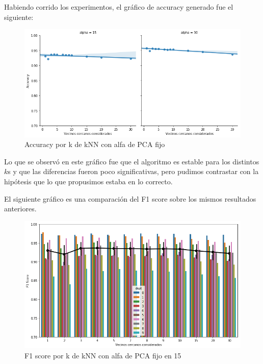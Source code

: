 Habiendo corrido los experimentos, el gráfico de accuracy generado fue el siguiente:

\begin{figure}[H]
    \begin{center}
      \includegraphics[width=0.8\columnwidth]{imagenes/Accuracy_15_30.png}
      \caption{Accuracy por k de kNN con alfa de PCA fijo}
    \end{center}
\end{figure}

Lo que se observó en este gráfico fue que el algoritmo es estable para los distintos $k$s y que las diferencias fueron poco significativas, pero pudimos contrastar con la hipótesis que lo que propusimos estaba en lo correcto.

El siguiente gráfico es una comparación del F1 score sobre los mismos resultados anteriores.

\begin{figure}[H]
    \begin{center}
      \includegraphics[width=0.8\columnwidth]{imagenes/F1_alpha_15.png}
      \caption{F1 score por k de kNN con alfa de PCA fijo en 15}
    \end{center}
\end{figure}

